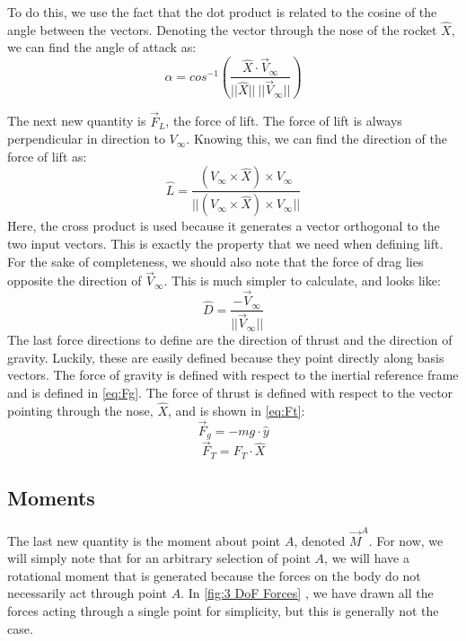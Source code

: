 \documentclass[10pt, openany, titlepage]{book}
\theoremstyle{definition}
\let\oldautoref\autoref
\renewcommand{\autoref}[1]{%
  \begingroup
  \hypersetup{linkcolor=black}%
  \oldautoref{#1}%
  \endgroup
}
\begin{document}
To do this, we use the fact that the dot product is related to the cosine of the angle between the vectors. Denoting the vector through the nose of the rocket $\hat{X}$, we can find the \gls{angle of attack} as:
\begin{equation}\label{eq:alpha}
    \alpha=cos^{-1}\left(\frac{\hat{X}\cdot \vec{V}_{\infty}}{||\hat{X}||\ ||\vec{V}_{\infty}||}\right)
\end{equation}

The next new quantity is $\vec{F}_L$, the force of lift. The force of lift is always perpendicular in direction to ${V}_{\infty}$. Knowing this, we can find the direction of the force of lift as:
\begin{equation}\label{eq:Lift}
    \hat{L}=\frac{({V}_{\infty} \times \hat{X}) \times {V}_{\infty}}{||({V}_{\infty} \times \hat{X}) \times {V}_{\infty}||}
\end{equation}
Here, the cross product is used because it generates a vector orthogonal to the two input vectors. This is exactly the property that we need when defining lift. For the sake of completeness, we should also note that the force of drag lies opposite the direction of $\vec{V}_{\infty}$. This is much simpler to calculate, and looks like:
\begin{equation}\label{eq:drag}
\hat{D}=\frac{-\vec{V}_{\infty}}{||\vec{V}_{\infty}||}
\end{equation}
The last force directions to define are the direction of thrust and the direction of gravity. Luckily, these are easily defined because they point directly along basis vectors. The force of gravity is defined with respect to the inertial reference frame and is defined in \eqref{eq:Fg}. The force of thrust is defined with respect to the vector pointing through the nose, $\hat{X}$, and is shown in \eqref{eq:Ft}:
\begin{equation}\label{eq:Fg}
    \vec{F}_g=-mg\cdot \hat{y}
\end{equation}
\begin{equation}\label{eq:Ft}
    \vec{F}_T=F_T\cdot \hat{X}
\end{equation}
\subsection{Moments}\label{sec:moments}
The last new quantity is the moment about point $A$, denoted $\vec{M}^A$. For now, we will simply note that for an arbitrary selection of point $A$, we will have a rotational moment that is generated because the forces on the body do not necessarily act through point $A$. In \autoref{fig:3 DoF Forces}, we have drawn all the forces acting through a single point for simplicity, but this is generally not the case.
\end{document}
